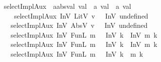 \begin{isabellebody}\isanewline
{}\isamarkupfalse%
\ selectImplAux\ {\isacharcolon}{\kern0pt}{\isacharcolon}{\kern0pt}\ {\isachardoublequoteopen}{\isacharprime}{\kern0pt}a{\isacharcolon}{\kern0pt}{\isacharcolon}{\kern0pt}absval\ val{}{}{}{}\ {\isasymRightarrow}\ {\isacharprime}{\kern0pt}a\ val{}{}{}{}\ {\isasymRightarrow}\ {\isacharprime}{\kern0pt}a\ val{}{}{}{}{\isachardoublequoteclose}\ 
\isanewline\ \ \isanewline
\ \ \ \ {\isachardoublequoteopen}selectImplAux\ {\isacharparenleft}{\kern0pt}InV{}\ {\isacharparenleft}{\kern0pt}LitV{}\ v{\isacharparenright}{\kern0pt}{\isacharparenright}{\kern0pt}\ {\isacharunderscore}{\kern0pt}\ {\isacharequal}{\kern0pt}\ {\isacharparenleft}{\kern0pt}InV{}\ undefined{\isacharparenright}{\kern0pt}{\isachardoublequoteclose}\isanewline
\ \ {\isacharbar}{\kern0pt}\ {\isachardoublequoteopen}selectImplAux\ {\isacharparenleft}{\kern0pt}InV{\isadigit{0}}\ {\isacharparenleft}{\kern0pt}AbsV{\isadigit{0}}\ v{\isacharparenright}{\kern0pt}{\isacharparenright}{\kern0pt}\ {\isacharunderscore}{\kern0pt}\ {\isacharequal}{\kern0pt}\ {\isacharparenleft}{\kern0pt}InV{}\ undefined{\isacharparenright}{\kern0pt}{\isachardoublequoteclose}\isanewline
\ \ {\isacharbar}{\kern0pt}\ {\isachardoublequoteopen}selectImplAux\ {\isacharparenleft}{\kern0pt}InV{\isadigit{1}}\ {\isacharparenleft}{\kern0pt}FunL\ m\ {\isacharunderscore}{\kern0pt}\ {\isacharunderscore}{\kern0pt}{\isacharparenright}{\kern0pt}{\isacharparenright}{\kern0pt}\ {\isacharparenleft}{\kern0pt}InV{}\ k{\isacharparenright}{\kern0pt}\ {\isacharequal}{\kern0pt}\ InV{}{}\ {\isacharparenleft}{\kern0pt}m\ k{\isacharparenright}{\kern0pt}{\isachardoublequoteclose}\isanewline
\ \ {\isacharbar}{\kern0pt}\ {\isachardoublequoteopen}selectImplAux\ {\isacharparenleft}{\kern0pt}InV{\isadigit{2}}\ {\isacharparenleft}{\kern0pt}FunL\ m\ {\isacharunderscore}{\kern0pt}\ {\isacharunderscore}{\kern0pt}{\isacharparenright}{\kern0pt}{\isacharparenright}{\kern0pt}\ {\isacharparenleft}{\kern0pt}InV{}{}\ k{\isacharparenright}{\kern0pt}\ {\isacharequal}{\kern0pt}\ InV{\isadigit{2}}{\isadigit{1}}{\isadigit{0}}\ {\isacharparenleft}{\kern0pt}m\ k{\isacharparenright}{\kern0pt}{\isachardoublequoteclose}\isanewline
\ \ {\isacharbar}{\kern0pt}\ {\isachardoublequoteopen}selectImplAux\ {\isacharparenleft}{\kern0pt}InV{\isadigit{3}}\ {\isacharparenleft}{\kern0pt}FunL\ m\ {\isacharunderscore}{\kern0pt}\ {\isacharunderscore}{\kern0pt}{\isacharparenright}{\kern0pt}{\isacharparenright}{\kern0pt}\ {\isacharparenleft}{\kern0pt}InV{\isadigit{2}}{\isadigit{1}}{\isadigit{0}}\ k{\isacharparenright}{\kern0pt}\ {\isacharequal}{\kern0pt}\ {\isacharparenleft}{\kern0pt}m\ k{\isacharparenright}{\kern0pt}{\isachardoublequoteclose}\isanewline

\end{isabellebody}
